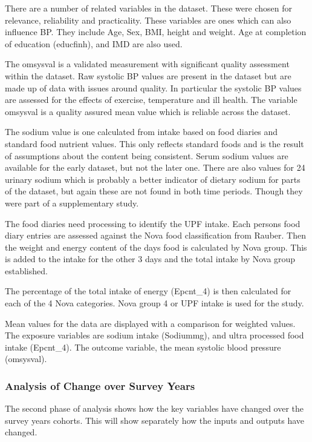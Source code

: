 \documentclass[
]{article}
\begin{document}
There are a number of related variables in the dataset. These were
chosen for relevance, reliability and practicality. These variables are
ones which can also influence BP. They include Age, Sex, BMI, height and
weight. Age at completion of education (educfinh), and IMD are also
used.

The omsysval is a validated measurement with significant quality
assessment within the dataset. Raw systolic BP values are present in the
dataset but are made up of data with issues around quality. In
particular the systolic BP values are assessed for the effects of
exercise, temperature and ill health. The variable omsysval is a quality
assured mean value which is reliable across the dataset.

The sodium value is one calculated from intake based on food diaries and
standard food nutrient values. This only reflects standard foods and is
the result of assumptions about the content being consistent. Serum
sodium values are available for the early dataset, but not the later
one. There are also values for 24 urinary sodium which is probably a
better indicator of dietary sodium for parts of the dataset, but again
these are not found in both time periods. Though they were part of a
supplementary study.

The food diaries need processing to identify the UPF intake. Each
persons food diary entries are assessed against the Nova food
classification from Rauber. Then the weight and energy content of the
days food is calculated by Nova group. This is added to the intake for
the other 3 days and the total intake by Nova group established.

The percentage of the total intake of energy (Epcnt\_4) is then
calculated for each of the 4 Nova categories. Nova group 4 or UPF intake
is used for the study.

Mean values for the data are displayed with a comparison for weighted
values. The exposure variables are sodium intake (Sodiummg), and ultra
processed food intake (Epcnt\_4). The outcome variable, the mean
systolic blood pressure (omsysval).

\hypertarget{analysis-of-change-over-survey-years}{%
\subsubsection{Analysis of Change over Survey
Years}\label{analysis-of-change-over-survey-years}}

The second phase of analysis shows how the key variables have changed
over the survey years cohorts. This will show separately how the inputs
and outputs have changed.
\end{document}
